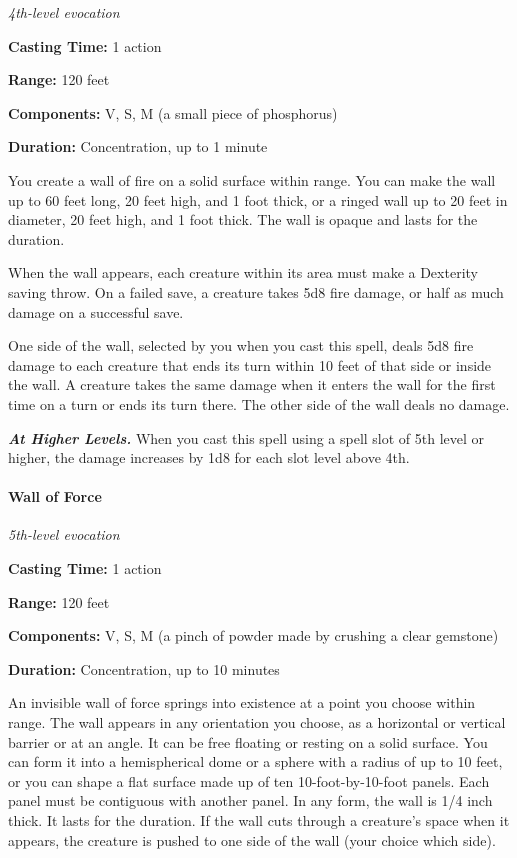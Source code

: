 \documentclass[
]{article}
\begin{document}
\emph{4th-level evocation}

\textbf{Casting Time:} 1 action

\textbf{Range:} 120 feet

\textbf{Components:} V, S, M (a small piece of phosphorus)

\textbf{Duration:} Concentration, up to 1 minute

You create a wall of fire on a solid surface within range. You can make
the wall up to 60 feet long, 20 feet high, and 1 foot thick, or a ringed
wall up to 20 feet in diameter, 20 feet high, and 1 foot thick. The wall
is opaque and lasts for the duration.

When the wall appears, each creature within its area must make a
Dexterity saving throw. On a failed save, a creature takes 5d8 fire
damage, or half as much damage on a successful save.

One side of the wall, selected by you when you cast this spell, deals
5d8 fire damage to each creature that ends its turn within 10 feet of
that side or inside the wall. A creature takes the same damage when it
enters the wall for the first time on a turn or ends its turn there. The
other side of the wall deals no damage.

\emph{\textbf{At Higher Levels.}} When you cast this spell using a spell
slot of 5th level or higher, the damage increases by 1d8 for each slot
level above 4th.

\hypertarget{wall-of-force}{%
\paragraph{Wall of Force}\label{wall-of-force}}

\emph{5th-level evocation}

\textbf{Casting Time:} 1 action

\textbf{Range:} 120 feet

\textbf{Components:} V, S, M (a pinch of powder made by crushing a clear
gemstone)

\textbf{Duration:} Concentration, up to 10 minutes

An invisible wall of force springs into existence at a point you choose
within range. The wall appears in any orientation you choose, as a
horizontal or vertical barrier or at an angle. It can be free floating
or resting on a solid surface. You can form it into a hemispherical dome
or a sphere with a radius of up to 10 feet, or you can shape a flat
surface made up of ten 10-foot-by-10-foot panels. Each panel must be
contiguous with another panel. In any form, the wall is 1/4 inch thick.
It lasts for the duration. If the wall cuts through a creature's space
when it appears, the creature is pushed to one side of the wall (your
choice which side).
\end{document}
